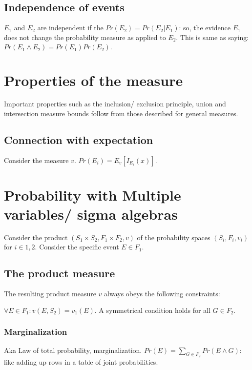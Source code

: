 \documentclass[oneside, article]{memoir}
\begin{document}

\subsection{Independence of events}
$E_1$ and $E_2$ are independent if the $Pr(E_2) = Pr(E_2|E_1)$: so, the evidence $E_1$ does not change the probability measure as applied to $E_2$. This is same as saying: $Pr(E_1 \land E_2) = Pr(E_1) Pr(E_2)$.

\section{Properties of the measure}
Important properties such as the inclusion/ exclusion principle, union and intersection measure bounds follow from those described for general measures.

\subsection{Connection with expectation}
Consider the measure $v$. $Pr(E_i) = E_v[I_{E_i}(x)]$.

\section{Probability with Multiple variables/ sigma algebras}
Consider the product $(S_1 \times S_2, F_1 \times F_2, v)$ of the probability spaces $(S_i, F_i, v_i)$ for $i \in {1, 2}$. Consider the specific event $E \in F_1$.

\subsection{The product measure}
The resulting product measure $v$ always obeys the following constraints:

$\forall E \in F_1: v(E, S_2) = v_1(E)$. A symmetrical condition holds for all $G \in F_2$.

\subsubsection{Marginalization}
Aka Law of total probability, marginalization. $Pr(E) = \sum_{G \in F_2} Pr(E \land G)$: like adding up rows in a table of joint probabilities.
\end{document}
